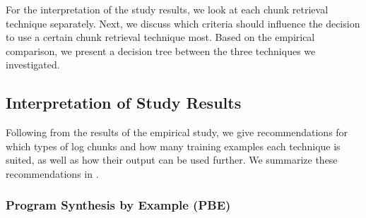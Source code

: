 For the interpretation of the study results, we look at each chunk
retrieval technique separately.
Next, we discuss
which criteria should influence the decision to use a certain
chunk retrieval technique most.
Based on the empirical comparison, we present a
decision tree between the three techniques we investigated.

\subsection{Interpretation of Study Results}
Following from the results of the empirical study,
we give recommendations for
which types of log chunks and how many training examples
each technique is suited, as well as
how their output can be used further.
We summarize these recommendations in
.

\begin{table}[tbp]
\caption{Recommendations for each of the investigated chunk retrieval
techniques.}
\label{tab:single-technique-recommendations}

\end{table}

\subsubsection{Program Synthesis by Example (PBE)}

